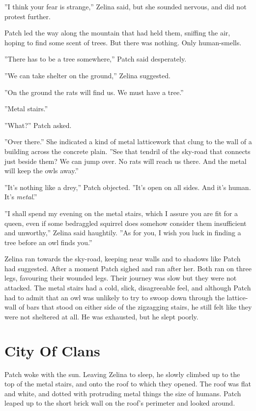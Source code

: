 \documentclass[12pt]{book}
\begin{document}
''I think your fear is strange,'' Zelina said, but she sounded nervous, and did not protest further.

Patch led the way along the mountain that had held them, sniffing the air, hoping to find some scent of trees. But there was nothing. Only human-smells.

''There has to be a tree somewhere,'' Patch said desperately.

''We can take shelter on the ground,'' Zelina suggested.

''On the ground the rats will find us. We must have a tree.''

''Metal stairs.''

''What?'' Patch asked.

''Over there.'' She indicated a kind of metal latticework that clung to the wall of a building across the concrete plain. ''See that tendril of the sky-road that connects just beside them? We can jump over. No rats will reach us there. And the metal will keep the owls away.''

''It's nothing like a drey,'' Patch objected. ''It's open on all sides. And it's human. It's {\it metal}.''

''I shall spend my evening on the metal stairs, which I assure you are fit for a queen, even if some bedraggled squirrel does somehow consider them insufficient and unworthy,'' Zelina said haughtily. ''As for you, I wish you luck in finding a tree before an owl finds you.''

Zelina ran towards the sky-road, keeping near walls and to shadows like Patch had suggested. After a moment Patch sighed and ran after her. Both ran on three legs, favouring their wounded legs. Their journey was slow but they were not attacked. The metal stairs had a cold, slick, disagreeable feel, and although Patch had to admit that an owl was unlikely to try to swoop down through the lattice-wall of bars that stood on either side of the zigzagging stairs, he still felt like they were not sheltered at all. He was exhausted, but he slept poorly.


\section{City Of Clans}

Patch woke with the sun. Leaving Zelina to sleep, he slowly climbed up to the top of the metal stairs, and onto the roof to which they opened. The roof was flat and white, and dotted with protruding metal things the size of humans. Patch leaped up to the short brick wall on the roof's perimeter and looked around.
\end{document}
